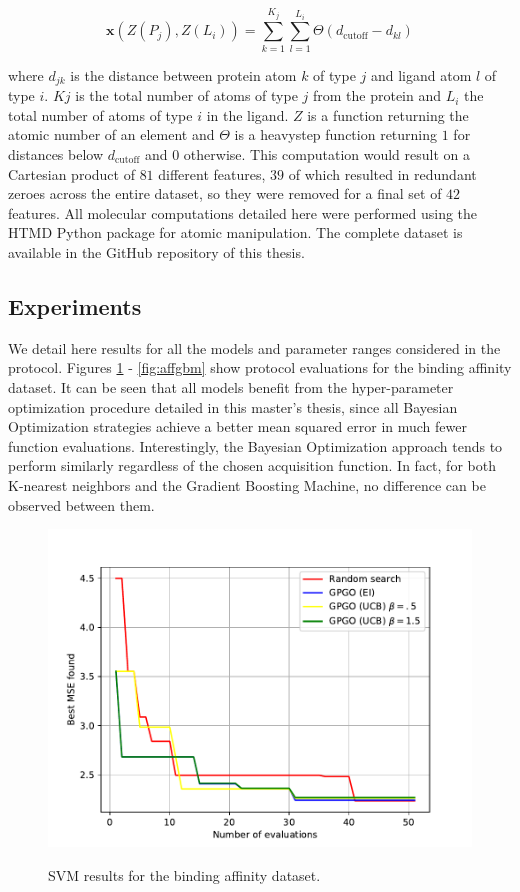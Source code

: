 \documentclass[10pt,a4paper,twoside]{book}
\begin{document}
\begin{equation}
\boldsymbol{x}\left(Z(P_j), Z(L_i)\right) = \sum_{k=1}^{K_j}\sum_{l=1}^{L_i}\Theta (d_{\mathrm{cutoff}} - d_{kl})
\end{equation}

where $d_{jk}$ is the distance between protein atom $k$ of type $j$ and ligand atom $l$ of type $i$. $Kj$ is the total number of atoms of type $j$ from the protein and $L_i$ the total number of atoms of type $i$ in the ligand. $Z$ is a function returning the atomic number of an element and $\Theta$ is a heavystep function returning $1$ for distances below $d_{\mathrm{cutoff}}$ and $0$ otherwise. This computation would result on a Cartesian product of $81$ different features, $39$ of which resulted in redundant zeroes across the entire dataset, so they were removed for a final set of $42$ features. All molecular computations detailed here were performed using the HTMD Python package \cite{Doerr2016} for atomic manipulation. The complete dataset is available in the GitHub repository of this thesis.


\subsection{Experiments}

We detail here results for all the models and parameter ranges considered in the protocol. Figures \ref{fig:affsvm} - \ref{fig:affgbm} show protocol evaluations for the binding affinity dataset. It can be seen that all models benefit from the hyper-parameter optimization procedure detailed in this master's thesis, since all Bayesian Optimization strategies achieve a better mean squared error in much fewer function evaluations. Interestingly, the Bayesian Optimization approach tends to perform similarly regardless of the chosen acquisition function. In fact, for both K-nearest neighbors and the Gradient Boosting Machine, no difference can be observed between them.

\begin{figure}
\centering
\caption{SVM results for the binding affinity dataset.}
\includegraphics[scale=0.75]{figures/chapter4/aff/svm}
\label{fig:affsvm}
\end{figure}
\end{document}
